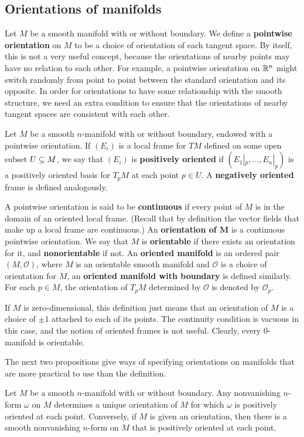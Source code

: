 \subsection{Orientations of manifolds}
Let $M$ be a smooth manifold with or without boundary. We define a \textbf{pointwise orientation} on $M$ to be a choice of orientation of each tangent space. By itself, this is not a very useful concept, because the orientations of nearby points may have no relation to each other. For example, a pointwise orientation on $\mathbb{R}^n$ might switch randomly from point to point between the standard orientation and its opposite. In order for orientations to have some relationship with the smooth structure, we need an extra condition to ensure that the orientations of nearby tangent spaces are consistent with each other.\par
Let $M$ be a smooth $n$-manifold with or without boundary, endowed with a pointwise orientation. If $(E_i)$ is a local frame for $TM$ defined on some open subset $U\subseteq M$, we say that $(E_i)$ is \textbf{positively oriented} if $(E_1|_p,\dots,E_n|_p)$ is a positively oriented basis for $T_pM$ at each point $p\in U$. A \textbf{negatively oriented} frame is defined analogously.\par
A pointwise orientation is said to be \textbf{continuous} if every point of $M$ is in the domain of an oriented local frame. (Recall that by definition the vector fields that make up a local frame are continuous.) An \textbf{orientation of $\bm{M}$} is a continuous pointwise orientation. We say that $M$ is \textbf{orientable} if there exists an orientation for it, and \textbf{nonorientable} if not. An \textbf{oriented manifold} is an ordered pair $(M,\mathcal{O})$, where $M$ is an orientable smooth manifold and $\mathcal{O}$ is a choice of orientation for $M$, an \textbf{oriented manifold with boundary} is defined similarly. For each $p\in M$, the orientation of $T_pM$ determined by $\mathcal{O}$ is denoted by $\mathcal{O}_p$.\par
If $M$ is zero-dimensional, this definition just means that an orientation of $M$ is a
choice of $\pm1$ attached to each of its points. The continuity condition is vacuous in this case, and the notion of oriented frames is not useful. Clearly, every $0$-manifold is orientable.\par
The next two propositions give ways of specifying orientations on manifolds that
are more practical to use than the definition.
\begin{proposition}\label{orientation n form}
Let $M$ be a smooth $n$-manifold with or without boundary. Any nonvanishing $n$-form $\omega$ on $M$ determines a unique orientation of $M$ for which $\omega$ is positively oriented at each point. Conversely, if $M$ is given an orientation, then there is a smooth nonvanishing $n$-form on $M$ that is positively oriented at each point.
\end{proposition}
